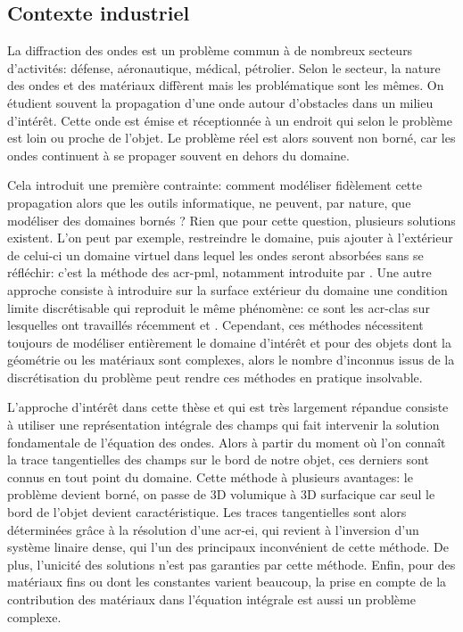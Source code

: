 \subsection*{Contexte industriel}
La diffraction des ondes est un problème commun à de nombreux secteurs d'activités: défense, aéronautique, médical, pétrolier.
Selon le secteur, la nature des ondes et des matériaux diffèrent mais les problématique sont les mêmes.
On étudient souvent la propagation d'une onde autour d'obstacles dans un milieu d’intérêt.
Cette onde est émise et réceptionnée à un endroit qui selon le problème est loin ou proche de l'objet.
Le problème réel est alors souvent non borné, car les ondes continuent à se propager souvent en dehors du domaine. 

Cela introduit une première contrainte: comment modéliser fidèlement cette propagation alors que les outils informatique, ne peuvent, par nature, que modéliser des domaines bornés ?
Rien que pour cette question, plusieurs solutions existent.
L'on peut par exemple, restreindre le domaine, puis ajouter à l'extérieur de celui-ci un domaine virtuel dans lequel les ondes seront absorbées sans se réfléchir: c'est la méthode des \gls{acr-pml}, notamment introduite par \cite{berenger_perfectly_1994}.
Une autre approche consiste à introduire sur la surface extérieur du domaine une condition limite discrétisable qui reproduit le même phénomène: ce sont les \glspl{acr-cla} sur lesquelles ont travaillés récemment \cite{barucq_etude_1993} et \cite{duprat_conditions_2011}.
Cependant, ces méthodes nécessitent toujours de modéliser entièrement le domaine d’intérêt et pour des objets dont la géométrie ou les matériaux sont complexes, alors le nombre d'inconnus issus de la discrétisation du problème peut rendre ces méthodes en pratique insolvable.

L'approche d’intérêt dans cette thèse et qui est très largement répandue consiste à utiliser une représentation intégrale des champs qui fait intervenir la solution fondamentale de l'équation des ondes.
Alors à partir du moment où l'on connaît la trace tangentielles des champs sur le bord de notre objet, ces derniers sont connus en tout point du domaine.
Cette méthode à plusieurs avantages: le problème devient borné, on passe de 3D volumique à 3D surfacique car seul le bord de l'objet devient caractéristique.
Les traces tangentielles sont alors déterminées grâce à la résolution d'une \gls{acr-ei}, qui revient à l'inversion d'un système linaire dense, qui l'un des principaux inconvénient de cette méthode.
De plus, l'unicité des solutions n'est pas garanties par cette méthode.
Enfin, pour des matériaux fins ou dont les constantes varient beaucoup, la prise en compte de la contribution des matériaux dans l'équation intégrale est aussi un problème complexe.

